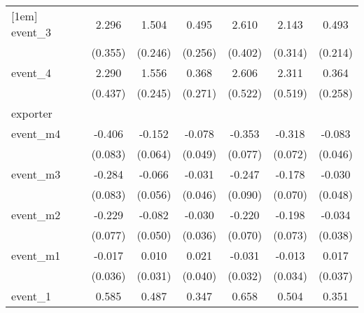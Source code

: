 {\begin{tabular}{l*{6}{c}}
[1em]
event\_3     &       2.296\sym{***}&       1.504\sym{***}&       0.495         &       2.610\sym{***}&       2.143\sym{***}&       0.493\sym{*}  \\
            &     (0.355)         &     (0.246)         &     (0.256)         &     (0.402)         &     (0.314)         &     (0.214)         \\
[1em]
event\_4     &       2.290\sym{***}&       1.556\sym{***}&       0.368         &       2.606\sym{***}&       2.311\sym{***}&       0.364         \\
            &     (0.437)         &     (0.245)         &     (0.271)         &     (0.522)         &     (0.519)         &     (0.258)         \\
\hline
exporter    &                     &                     &                     &                     &                     &                     \\
event\_m4    &      -0.406\sym{***}&      -0.152\sym{*}  &      -0.078         &      -0.353\sym{***}&      -0.318\sym{***}&      -0.083         \\
            &     (0.083)         &     (0.064)         &     (0.049)         &     (0.077)         &     (0.072)         &     (0.046)         \\
[1em]
event\_m3    &      -0.284\sym{***}&      -0.066         &      -0.031         &      -0.247\sym{**} &      -0.178\sym{*}  &      -0.030         \\
            &     (0.083)         &     (0.056)         &     (0.046)         &     (0.090)         &     (0.070)         &     (0.048)         \\
[1em]
event\_m2    &      -0.229\sym{**} &      -0.082         &      -0.030         &      -0.220\sym{**} &      -0.198\sym{**} &      -0.034         \\
            &     (0.077)         &     (0.050)         &     (0.036)         &     (0.070)         &     (0.073)         &     (0.038)         \\
[1em]
event\_m1    &      -0.017         &       0.010         &       0.021         &      -0.031         &      -0.013         &       0.017         \\
            &     (0.036)         &     (0.031)         &     (0.040)         &     (0.032)         &     (0.034)         &     (0.037)         \\
[1em]
event\_1     &       0.585\sym{***}&       0.487\sym{***}&       0.347\sym{***}&       0.658\sym{***}&       0.504\sym{***}&       0.351\sym{***}\\

\end{tabular}}
